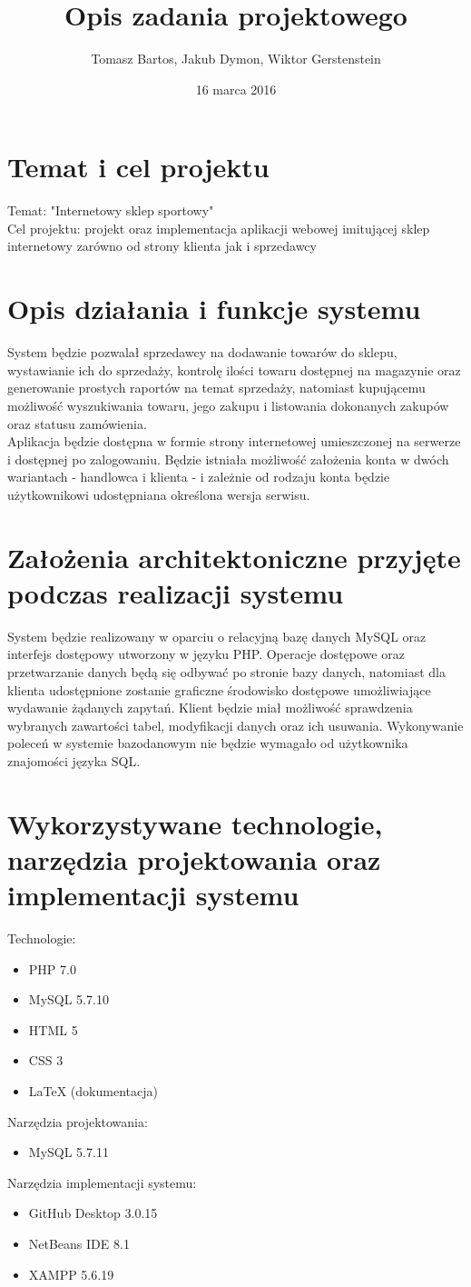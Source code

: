 \documentclass[a4paper, 11pt]{article}
\title{Opis zadania projektowego}
\author{Tomasz Bartos, Jakub Dymon, Wiktor Gerstenstein}
\date{16 marca 2016}
\begin{document}
\maketitle
\section{Temat i cel projektu}
Temat: "Internetowy sklep sportowy"\\
Cel projektu: projekt oraz implementacja aplikacji webowej imitującej sklep internetowy zarówno od strony klienta jak i sprzedawcy
\section{Opis działania i funkcje systemu}
System będzie pozwalał sprzedawcy na dodawanie towarów do sklepu, wystawianie ich do sprzedaży, kontrolę ilości towaru dostępnej na magazynie oraz generowanie prostych raportów na temat sprzedaży, natomiast kupującemu możliwość wyszukiwania towaru, jego zakupu i listowania dokonanych zakupów oraz statusu zamówienia.\\
Aplikacja będzie dostępna w formie strony internetowej umieszczonej na serwerze i dostępnej po zalogowaniu. Będzie istniała możliwość założenia konta w dwóch wariantach - handlowca i klienta - i zależnie od rodzaju konta będzie użytkownikowi udostępniana określona wersja serwisu.
\section{Założenia architektoniczne przyjęte podczas realizacji systemu}
System będzie realizowany w oparciu o relacyjną bazę danych MySQL oraz interfejs dostępowy utworzony w języku PHP. Operacje dostępowe oraz przetwarzanie danych będą się odbywać po stronie bazy danych, natomiast dla klienta udostępnione zostanie graficzne środowisko dostępowe umożliwiające wydawanie żądanych zapytań. Klient będzie miał możliwość sprawdzenia wybranych zawartości tabel, modyfikacji danych oraz ich usuwania. Wykonywanie poleceń w systemie bazodanowym nie będzie wymagało od użytkownika znajomości języka SQL.
\section{Wykorzystywane technologie, narzędzia projektowania oraz implementacji systemu}
Technologie:
\begin{itemize}
	\item PHP 7.0
	\item MySQL 5.7.10
	\item HTML 5
	\item CSS 3
	\item LaTeX (dokumentacja)
\end{itemize}
Narzędzia projektowania:
\begin{itemize}
	\item MySQL 5.7.11
\end{itemize}
Narzędzia implementacji systemu:
\begin{itemize}
	\item GitHub Desktop 3.0.15
	\item NetBeans IDE 8.1
	\item XAMPP 5.6.19
\end{itemize}
\end{document}
